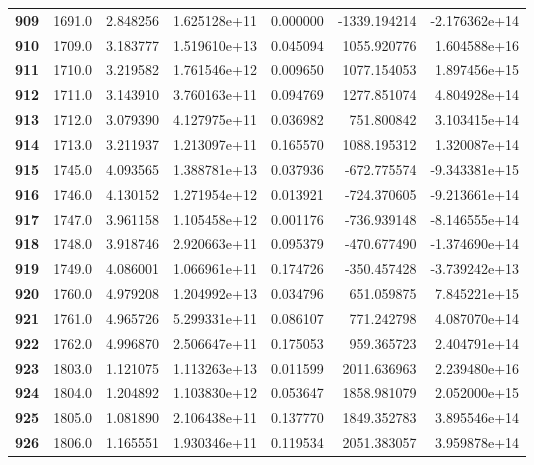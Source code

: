 \documentclass{report}[12pt]
\begin{document}
\begin{center}
\begin{tabular}{lrrrrrr}
\textbf{909 } &         1691.0 &   2.848256 &  1.625128e+11 &    0.000000 & -1339.194214 & -2.176362e+14 \\
\textbf{910 } &         1709.0 &   3.183777 &  1.519610e+13 &    0.045094 &  1055.920776 &  1.604588e+16 \\
\textbf{911 } &         1710.0 &   3.219582 &  1.761546e+12 &    0.009650 &  1077.154053 &  1.897456e+15 \\
\textbf{912 } &         1711.0 &   3.143910 &  3.760163e+11 &    0.094769 &  1277.851074 &  4.804928e+14 \\
\textbf{913 } &         1712.0 &   3.079390 &  4.127975e+11 &    0.036982 &   751.800842 &  3.103415e+14 \\
\textbf{914 } &         1713.0 &   3.211937 &  1.213097e+11 &    0.165570 &  1088.195312 &  1.320087e+14 \\
\textbf{915 } &         1745.0 &   4.093565 &  1.388781e+13 &    0.037936 &  -672.775574 & -9.343381e+15 \\
\textbf{916 } &         1746.0 &   4.130152 &  1.271954e+12 &    0.013921 &  -724.370605 & -9.213661e+14 \\
\textbf{917 } &         1747.0 &   3.961158 &  1.105458e+12 &    0.001176 &  -736.939148 & -8.146555e+14 \\
\textbf{918 } &         1748.0 &   3.918746 &  2.920663e+11 &    0.095379 &  -470.677490 & -1.374690e+14 \\
\textbf{919 } &         1749.0 &   4.086001 &  1.066961e+11 &    0.174726 &  -350.457428 & -3.739242e+13 \\
\textbf{920 } &         1760.0 &   4.979208 &  1.204992e+13 &    0.034796 &   651.059875 &  7.845221e+15 \\
\textbf{921 } &         1761.0 &   4.965726 &  5.299331e+11 &    0.086107 &   771.242798 &  4.087070e+14 \\
\textbf{922 } &         1762.0 &   4.996870 &  2.506647e+11 &    0.175053 &   959.365723 &  2.404791e+14 \\
\textbf{923 } &         1803.0 &   1.121075 &  1.113263e+13 &    0.011599 &  2011.636963 &  2.239480e+16 \\
\textbf{924 } &         1804.0 &   1.204892 &  1.103830e+12 &    0.053647 &  1858.981079 &  2.052000e+15 \\
\textbf{925 } &         1805.0 &   1.081890 &  2.106438e+11 &    0.137770 &  1849.352783 &  3.895546e+14 \\
\textbf{926 } &         1806.0 &   1.165551 &  1.930346e+11 &    0.119534 &  2051.383057 &  3.959878e+14 \\

\end{tabular}
\end{center}
\end{document}

